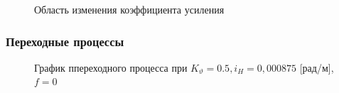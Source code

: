 \documentclass[a4paper,12pt]{article}
\begin{document}
\begin{enumerate}
    \begin{figure}[H]
        \caption{Область изменения коэффициента усиления}
        \label{fig:Область изменения коэффициента усиления}
    \end{figure}

    \end{enumerate}
    
    \subsubsection{Переходные процессы}

    \begin{figure}[H]
        \caption{График ппереходного процесса при $K_{\vartheta}=0.5, i_H=0,000875$ [рад/м], $f=0$}
        \label{fig:Переходный процесс 1}
    \end{figure}
\end{document}
